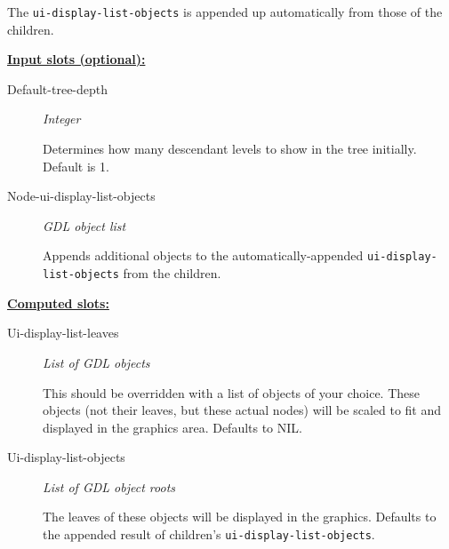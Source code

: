 \documentclass [11pt]{book}
\begin{document}
\begin{itemize}
\begin{description}
The \texttt{ui-display-list-objects} is appended up automatically from those of the children.



\end{description}








\textbf{
\underline{Input slots (optional):}}

\begin{description}

\item [Default-tree-depth]
\emph{Integer}

 Determines how many descendant levels to show in the tree initially. Default is 1.




\item [Node-ui-display-list-objects]
\emph{GDL object list}

 Appends additional objects to the automatically-appended \texttt{ui-display-list-objects}
from the children.




\end{description}






\textbf{
\underline{Computed slots:}}

\begin{description}

\item [Ui-display-list-leaves]
\emph{List of GDL objects}

 This should be overridden with a list of objects of your choice. These objects (not their leaves,
but these actual nodes) will be scaled to fit and displayed in the graphics area. Defaults to NIL.




\item [Ui-display-list-objects]
\emph{List of GDL object roots}

 The leaves of these objects will be
displayed in the graphics. Defaults to the appended result of children's
\texttt{ui-display-list-objects}.




\end{description}








\end{itemize}
\end{document}
